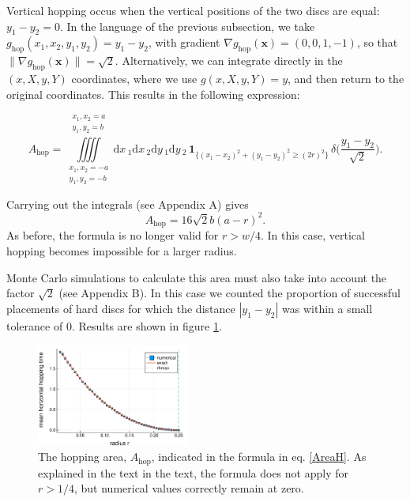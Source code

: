 \documentclass[superscriptaddress,pre,reprint,showpacs,twocolumn]{revtex4-1}
\newcommand{\rd}[1]{\mathrm{d}{#1} \,}
\newcommand{\indicatorsymbol}{\mathbf{1}}
\newcommand{\indicator}[1]{\indicatorsymbol_{ \{   #1 \} } }
\begin{document}
Vertical hopping occus when the vertical positions of the two discs are equal: $y_1 - y_2=0$. In the language of the previous subsection, we take
 $g_\mathrm{hop}(x_1, x_2, y_1, y_2)= y_1 - y_2$, with gradient  $\nabla g_\mathrm{hop}(\mathbf{x}) = (0, 0, 1, -1)$, so that $ \| \nabla g_\mathrm{hop}(\mathbf{x}) \| = \sqrt{2}$. 
 Alternatively, we can integrate 
directly in the $(x,X,y,Y)$ coordinates, where we use
$g(x,X,y,Y) = y$, and then return to the original coordinates. This results in the following expression:
\begin{widetext}
\begin{equation}
  A_\text{hop} =
\iiiint
\limits_{\substack{x_1, x_2 = -a \\ y_1, y_2 = -b}}^{\substack{x_1, x_2 = a \\ y_1, y_2 = b}}
\rd x_1 \rd x_2 \rd y_1 \rd y_2 
 \, \indicator{ (x_1-x_2)^2 + (y_1-y_2)^2 \ge (2r)^2 } \, \delta \big(\frac{y_1-y_2}{\sqrt{2}}\big).
\end{equation}
\end{widetext}
Carrying out the integrals  (see Appendix A) gives
 \begin{equation}\label{AreaH}
 A_\text{hop}  =  16 \sqrt{2} b(a-r)^2.
\end{equation}
As before, the formula is no longer valid for $r > w/4$. In this case,
vertical hopping becomes impossible for a larger radius.

Monte Carlo simulations to calculate this area must also
take into account the factor $\sqrt{2}$ (see Appendix B).
In this case we counted the proportion of successful placements of hard discs 
for which the distance 
$|y_1 - y_2|$ was within a small tolerance of $0$. 
Results are shown in figure \ref{AreaHopp01}.

\begin{figure}[h]
\centering
\includegraphics[width=0.45\textwidth]{./figures/AreaHop01.pdf}
\caption{The hopping area, $A_\text{hop}$, 
  indicated in the formula in eq. \ref{AreaH}. As explained in the text
in the text, the formula does not apply for $r>1/4$, but numerical values correctly
remain at zero.}
\label{AreaHopp01}
\end{figure}
\end{document}
